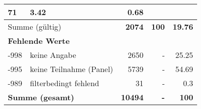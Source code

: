 \begin{longtable}{lXrrr}
       \num{71} &
       \num[round-mode=places,round-precision=2]{3.42} &
         \num[round-mode=places,round-precision=2]{0.68} \\
     \midrule
     \multicolumn{2}{l}{Summe (gültig)} &
       \textbf{\num{2074}} &
     \textbf{\num{100}} &
       \textbf{\num[round-mode=places,round-precision=2]{19.76}} \\
     \multicolumn{5}{l}{\textbf{Fehlende Werte}}\\
       -998 &
       keine Angabe &
         \num{2650} &
        - &
         \num[round-mode=places,round-precision=2]{25.25} \\
       -995 &
       keine Teilnahme (Panel) &
         \num{5739} &
        - &
         \num[round-mode=places,round-precision=2]{54.69} \\
       -989 &
       filterbedingt fehlend &
         \num{31} &
        - &
         \num[round-mode=places,round-precision=2]{0.3} \\
     \midrule
     \multicolumn{2}{l}{\textbf{Summe (gesamt)}} &
          \textbf{\num{10494}} &
        \textbf{-} &
        \textbf{\num{100}} \\
     \bottomrule
     \end{longtable}
     
